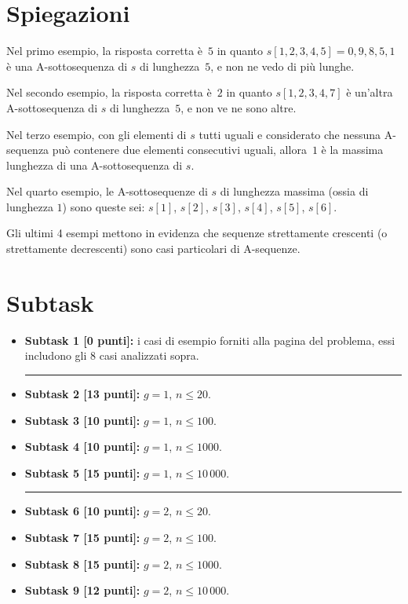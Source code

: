 \documentclass[a4paper,11pt]{article}
\begin{document}
\section*{Spiegazioni}
Nel primo esempio, la risposta corretta è~$5$ in quanto $s[1,2,3,4,5]=0,9,8,5,1$ è una A-sottosequenza di $s$ di lunghezza~$5$, e non ne vedo di più lunghe.

Nel secondo esempio, la risposta corretta è~$2$ in quanto $s[1,2,3,4,7]$ è un'altra A-sottosequenza di $s$ di lunghezza~$5$, e non ve ne sono altre.

Nel terzo esempio, con gli elementi di $s$ tutti uguali e considerato che nessuna A-sequenza può contenere due elementi consecutivi uguali, allora~$1$ è la massima lunghezza di una A-sottosequenza di $s$.

Nel quarto esempio, le A-sottosequenze di $s$ di lunghezza massima (ossia di lunghezza $1$) sono queste sei: $s[1]$, $s[2]$, $s[3]$, $s[4]$, $s[5]$, $s[6]$.

Gli ultimi 4 esempi mettono in evidenza che sequenze strettamente crescenti (o strettamente decrescenti) sono casi particolari di A-sequenze.

\section*{Subtask}
\begin{itemize}
  \item \textbf{Subtask 1 [0 punti]:} i casi di esempio forniti alla pagina del problema, essi includono gli 8 casi analizzati sopra.
      \vspace{-0.6cm}
       \begin{center}
      \rule{0.5\textwidth}{0.4pt} \hfill  \hfill \hfill
       \end{center}
      \vspace{-0.6cm}      
    \item \textbf{Subtask 2 [13 punti]:} $g=1$, $n \le 20$.
    \item \textbf{Subtask 3 [10 punti]:} $g=1$, $n \le 100$.
    \item \textbf{Subtask 4 [10 punti]:} $g=1$, $n \le 1000$.
    \item \textbf{Subtask 5 [15 punti]:} $g=1$, $n \le 10\,000$.
      \vspace{-0.6cm}
       \begin{center}
      \rule{0.5\textwidth}{0.4pt} \hfill  \hfill \hfill
       \end{center}
      \vspace{-0.6cm}      
    \item \textbf{Subtask 6 [10 punti]:} $g=2$, $n \le 20$.
    \item \textbf{Subtask 7 [15 punti]:} $g=2$, $n \le 100$.
    \item \textbf{Subtask 8 [15 punti]:} $g=2$, $n \le 1000$.
    \item \textbf{Subtask 9 [12 punti]:} $g=2$, $n \le 10\,000$.
\end{itemize}
\end{document}
